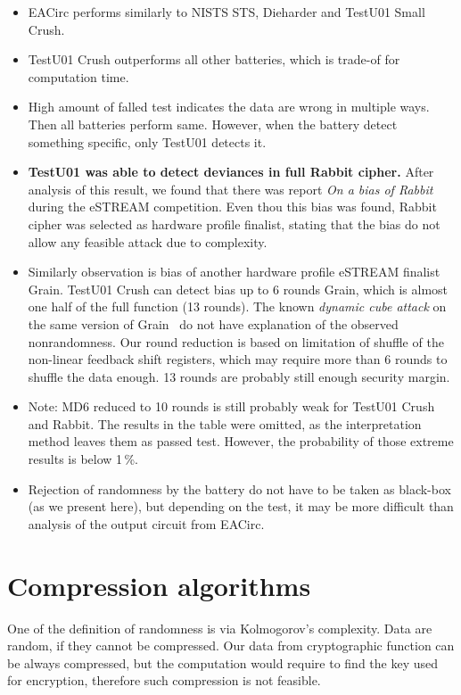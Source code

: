 \documentclass[
  print, %
  Table,   %
  nolof,     %
  nolot,     %
  11pt, %
  oneside  %
]{fithesis3}
\begin{document}
\begin{itemize}
    \item EACirc performs similarly to NISTS STS, Dieharder and TestU01 Small Crush.
    \item TestU01 Crush outperforms all other batteries, which is trade-of for computation time.
    \item High amount of falled test indicates the data are wrong in multiple ways. Then all batteries perform same. However, when the battery detect something specific, only TestU01 detects it.
    \item \textbf{TestU01 was able to detect deviances in full Rabbit cipher.} After analysis of this result, we found that there was report \textit{On a bias of Rabbit}~\cite{aumasson2007bias} during the eSTREAM competition. Even thou this bias was found, Rabbit cipher was selected as hardware profile finalist, stating that the bias do not allow any feasible attack due to complexity.
    \item Similarly observation is bias of another hardware profile eSTREAM finalist Grain. TestU01 Crush can detect bias up to 6 rounds Grain, which is almost one half of the full function (13 rounds). The known \textit{dynamic cube attack} on the same version of Grain~\cite{dinur2011breaking} do not have explanation of the observed nonrandomness. Our round reduction is based on limitation of shuffle of the non-linear feedback shift registers, which may require more than 6 rounds to shuffle the data enough. 13 rounds are probably still enough security margin.
    \item Note: MD6 reduced to 10 rounds is still probably weak for TestU01 Crush and Rabbit. The results in the table were omitted, as the interpretation method leaves them as passed test. However, the probability of those extreme results is below 1\,\%.{}
    \item Rejection of randomness by the battery do not have to be taken as black-box (as we present here), but depending on the test, it may be more difficult than analysis of the output circuit from EACirc.
\end{itemize}

\section{Compression algorithms}
\label{sec:relatwork-compress}

One of the definition of randomness is via Kolmogorov's complexity. Data are random, if they cannot be compressed. Our data from cryptographic function can be always compressed, but the computation would require to find the key used for encryption, therefore such compression is not feasible.
\end{document}
